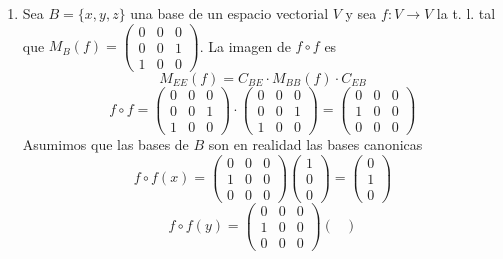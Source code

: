 \documentclass[../practica.root.tex]{subfiles}
\begin{document}
\begin{enumerate}
    \item Sea $B = \{x,y,z\}$ una base de un espacio vectorial $V$ y sea $f : V \to V$ la t. l. tal que $M_B(f) = \begin{pmatrix}
                  0 & 0 & 0 \\ 0 & 0 & 1 \\ 1 & 0 & 0
              \end{pmatrix}$. La imagen de $f \circ f$ es
          \[ M_{EE}(f) = C_{BE}\cdot M_{BB}(f)\cdot C_{EB} \]
          \[
              f \circ f = \begin{pmatrix}
                  0 & 0 & 0 \\ 0 & 0 & 1 \\ 1 & 0 & 0
              \end{pmatrix}\cdot\begin{pmatrix}
                  0 & 0 & 0 \\ 0 & 0 & 1 \\ 1 & 0 & 0
              \end{pmatrix} = \begin{pmatrix}
                  0 & 0 & 0 \\
                  1 & 0 & 0 \\
                  0 & 0 & 0
              \end{pmatrix}
          \]
          Asumimos que las bases de $B$ son en realidad las bases canonicas
          \[
              f \circ f(x) = \begin{pmatrix}
                  0 & 0 & 0 \\
                  1 & 0 & 0 \\
                  0 & 0 & 0
              \end{pmatrix}\begin{pmatrix}
                  1 \\ 0 \\ 0
              \end{pmatrix} = \begin{pmatrix}
                  0 \\ 1 \\ 0
              \end{pmatrix}
          \] \[
              f \circ f(y) = \begin{pmatrix}
                  0 & 0 & 0 \\
                  1 & 0 & 0 \\
                  0 & 0 & 0
              \end{pmatrix}\begin{pmatrix}

\end{pmatrix}\]
\end{enumerate}
\end{document}
